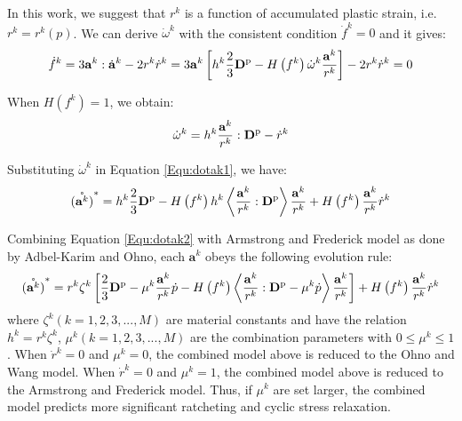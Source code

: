 In this work, we suggest that $r^k$ is a function of accumulated plastic strain, i.e. ${r^k} = {r^k}\left( p \right)$. We can derive ${\dot \omega ^k}$ with the consistent condition ${\dot f^k} = 0$ and it gives:
\begin{equation}
\label{Equ:dotfk}
{\dot f^k} = 3{{\mathbf{a}}^k}:{{\dot {\bf{a}}}^k} - 2{r^k}{\dot r^k} = 3{{\mathbf{a}}^k}\left[ {{h^k}\frac{2}{3}{{\mathbf{D}}^{\rm{p}}} - H\left( {{f^k}} \right){{\dot \omega }^k}\frac{{{{\mathbf{a}}^k}}}{{{r^k}}}} \right] - 2{r^k}{\dot r^k} = 0
\end{equation}

When $H\left( {{f^k}} \right) = 1$, we obtain:
\begin{equation}
\label{Equ:dotomegak}
{\dot \omega ^k} = {h^k}\frac{{{{\mathbf{a}}^k}}}{{{r^k}}}:{{\mathbf{D}}^{\rm{p}}} - {\dot r^k}
\end{equation}

Substituting ${\dot \omega ^k}$ in Equation \ref{Equ:dotak1}, we have:
\begin{equation}
\label{Equ:dotak2}
\mathring{\left({\mathbf{a}}^{k}\right)}^* = {h^k}\frac{2}{3}{{\mathbf{D}}^{\rm{p}}} - H\left( {{f^k}} \right){h^k}\left\langle {\frac{{{{\mathbf{a}}^k}}}{{{r^k}}}:{{\mathbf{D}}^{\rm{p}}}} \right\rangle \frac{{{{\mathbf{a}}^k}}}{{{r^k}}} + H\left( {{f^k}} \right)\frac{{{{\mathbf{a}}^k}}}{{{r^k}}}{\dot r^k}
\end{equation}

Combining Equation \ref{Equ:dotak2} with Armstrong and Frederick model as done by Adbel-Karim and Ohno, each ${{\mathbf{a}}^k}$ obeys the following evolution rule:
\begin{equation}
\label{Equ:dotak3}
\mathring{\left({\mathbf{a}}^{k}\right)}^* = {r^k}{\zeta ^k}\left[ {\frac{2}{3}{{\mathbf{D}}^{\rm{p}}} - {\mu ^k}\frac{{{{\mathbf{a}}^k}}}{{{r^k}}}\dot p - H\left( {{f^k}} \right)\left\langle {\frac{{{{\mathbf{a}}^k}}}{{{r^k}}}:{{\mathbf{D}}^{\rm{p}}} - {\mu ^k}\dot p} \right\rangle \frac{{{{\mathbf{a}}^k}}}{{{r^k}}}} \right] + H\left( {{f^k}} \right)\frac{{{{\mathbf{a}}^k}}}{{{r^k}}}{\dot r^k}
\end{equation}
where ${\zeta ^k}( k = 1,2,3,...,M )$ are material constants and have the relation ${h^k} = {r^k}{\zeta ^k}$, ${\mu ^k}( k = 1,2,3,...,M )$ are the combination parameters with $0 \leqslant {\mu ^k} \leqslant 1$. When ${\dot r^k} = 0$ and ${\mu ^k} = 0$, the combined model above is reduced to the Ohno and Wang model. When ${\dot r^k} = 0$ and ${\mu ^k} = 1$, the combined model above is reduced to the Armstrong and Frederick model. Thus, if ${\mu ^k}$ are set larger, the combined model predicts more significant ratcheting and cyclic stress relaxation.

